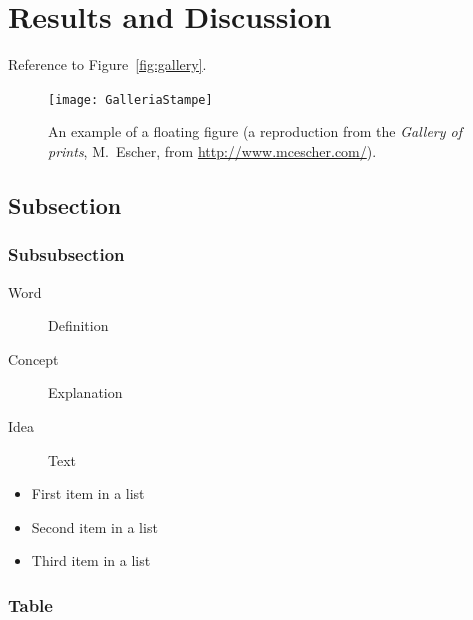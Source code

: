 \documentclass[
10pt, %
a4paper, %
oneside, %
headinclude,footinclude, %
BCOR5mm, %
]{scrartcl}
\begin{document}
\section{Results and Discussion}

Reference to Figure~\vref{fig:gallery}. %

\begin{figure}[tb]
\centering 
\texttt{[image: GalleriaStampe]} 
\caption[An example of a floating figure]{An example of a floating figure (a reproduction from the \emph{Gallery of prints}, M.~Escher, from \url{http://www.mcescher.com/}).} %
\label{fig:gallery} 
\end{figure}



\subsection{Subsection}


\subsubsection{Subsubsection}


\begin{description}
\item[Word] Definition
\item[Concept] Explanation
\item[Idea] Text
\end{description}


\begin{itemize}[noitemsep] %
\item First item in a list
\item Second item in a list
\item Third item in a list
\end{itemize}

\subsubsection{Table}
\end{document}
